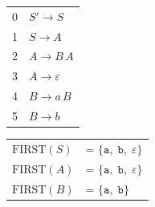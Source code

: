 \begin{center}
\begin{tabular}{r l}
0 & $S' \to S$ \\
1 & $S \to A$ \\
2 & $A \to B\,A$ \\
3 & $A \to \varepsilon$ \\
4 & $B \to a\,B$ \\
5 & $B \to b$
\end{tabular}
\end{center}


\begin{center}
\begin{tabular}{ll}
$\mathrm{FIRST}(S)$ & = $\{\texttt{a},\;\texttt{b},\;\varepsilon\}$ \\
$\mathrm{FIRST}(A)$ & = $\{\texttt{a},\;\texttt{b},\;\varepsilon\}$ \\
$\mathrm{FIRST}(B)$ & = $\{\texttt{a},\;\texttt{b}\}$ \\
\end{tabular}
\end{center}
